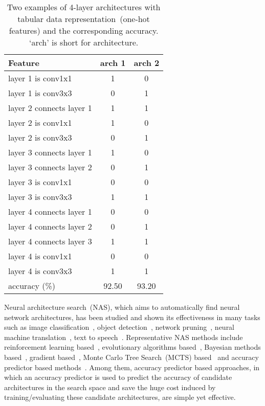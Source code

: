 \documentclass{article}
\begin{document}
\begin{table}
\centering
\caption{Two examples of 4-layer architectures with tabular data representation~(one-hot features) and the corresponding accuracy. `arch' is short for architecture.}
\label{tbl:tablur}
\begin{tabular}{l|c|c}
\toprule
Feature & arch 1 & arch 2\\
\midrule
layer 1 is conv1x1 & 1 & 0 \\
layer 1 is conv3x3 & 0 & 1 \\
layer 2 connects layer 1 & 1 & 1 \\
layer 2 is conv1x1 & 1 & 0 \\
layer 2 is conv3x3 & 0 & 1 \\
layer 3 connects layer 1 & 1 & 0 \\
layer 3 connects layer 2 & 0 & 1 \\
layer 3 is conv1x1 & 0 & 0 \\
layer 3 is conv3x3 & 1 & 1 \\
layer 4 connects layer 1 & 0 & 0 \\
layer 4 connects layer 2 & 0 & 1 \\
layer 4 connects layer 3 & 1 & 1 \\
layer 4 is conv1x1 & 0 & 0 \\
layer 4 is conv3x3 & 1 & 1 \\
\midrule
accuracy (\%) & 92.50 & 93.20 \\
\bottomrule
\end{tabular}
\end{table}

Neural architecture search~(NAS), which aims to automatically find neural network architectures, has been studied and shown its effectiveness in many tasks such as image classification~\cite{nas,nasnet}, object detection~\cite{nasfpn,detnas}, network pruning~\cite{autoslim}, neural machine translation~\cite{evovledtransformer}, text to speech~\cite{seminas}. Representative NAS methods include reinforcement learning based~\cite{nasnet,enas}, evolutionary algorithms based~\cite{amoebanet,darts}, Bayesian methods based~\cite{bayesnas}, gradient based~\cite{nao,darts}, Monte Carlo Tree Search~(MCTS) based~\cite{deeparchitect,mctsnas,lanas} and accuracy predictor based methods~\cite{nao,neuralpredictor,npenas}. Among them, accuracy predictor based approaches, in which an accuracy predictor is used to predict the accuracy of candidate architectures in the search space and save the huge cost induced by training/evaluating these candidate architectures, are simple yet effective. 
\end{document}
